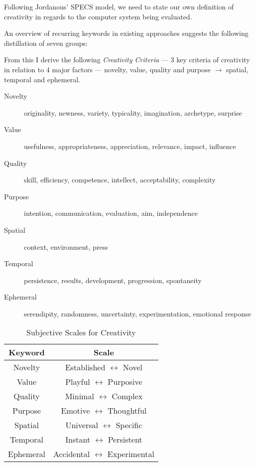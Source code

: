 Following Jordanous' \ac{SPECS} model, we need to state our own definition of creativity in regards to the computer system being evaluated.

An overview of recurring keywords in existing approaches suggests the following distillation of seven groups:

From this I derive the following \hypertarget{creadef}{\emph{Creativity Criteria}} --- \num{3} key criteria of creativity in relation to \num{4} major factors --- novelty, value, quality and purpose $\to$ spatial, temporal and ephemeral.

\begin{description}
  \item [Novelty] originality, newness, variety, typicality, imagination, archetype, surprise
  \item [Value] usefulness, appropriateness, appreciation, relevance, impact, influence
  \item [Quality] skill, efficiency, competence, intellect, acceptability, complexity
  \item [Purpose] intention, communication, evaluation, aim, independence
  \item [Spatial] context, environment, press
  \item [Temporal] persistence, results, development, progression, spontaneity
  \item [Ephemeral] serendipity, randomness, uncertainty, experimentation, emotional response
\end{description}


\begin{table}[!htbp]
\caption[Subjective Scales for Creativity]{Subjective Scales for Creativity}
\label{table_subcreat}
\centering
  \begin{tabu}{cc}
  \toprule
  \textbf{Keyword} & \textbf{Scale} \\
  \midrule
  Novelty & Established $\leftrightarrow$ Novel \\
  Value & Playful $\leftrightarrow$ Purposive \\
  Quality & Minimal $\leftrightarrow$ Complex \\
  Purpose & Emotive $\leftrightarrow$ Thoughtful \\
  Spatial & Universal $\leftrightarrow$ Specific \\
  Temporal & Instant $\leftrightarrow$ Persistent \\
  Ephemeral & Accidental $\leftrightarrow$ Experimental \\
  \bottomrule
  \end{tabu}
\end{table}


